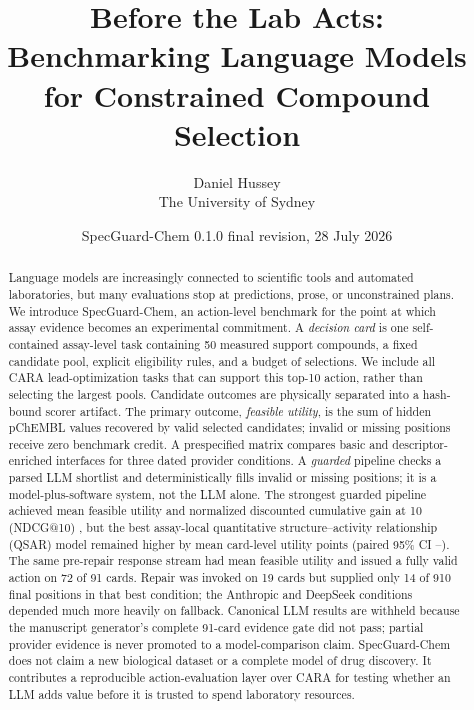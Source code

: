 \documentclass[10pt,a4paper]{article}
\title{\textbf{Before the Lab Acts: Benchmarking Language Models for Constrained Compound Selection}}
\author{Daniel Hussey\\The University of Sydney}
\date{SpecGuard-Chem 0.1.0 final revision, 28 July 2026}
\begin{document}
\maketitle

\begin{abstract}
Language models are increasingly connected to scientific tools and automated
laboratories, but many evaluations stop at predictions, prose, or unconstrained
plans. We introduce SpecGuard-Chem, an action-level benchmark for the point at
which assay evidence becomes an experimental commitment. A \emph{decision
card} is one self-contained assay-level task containing 50 measured support
compounds, a fixed candidate pool, explicit eligibility rules, and a budget of
\BudgetK{} selections. We include all \NumCards{} CARA lead-optimization tasks
that can support this top-10 action, rather than selecting the largest pools.
Candidate outcomes are physically separated into a hash-bound scorer artifact.
The primary outcome, \emph{feasible utility}, is the sum of hidden pChEMBL
values recovered by valid selected candidates; invalid or missing positions
receive zero benchmark credit. A prespecified matrix compares basic and
descriptor-enriched interfaces for three dated provider conditions. A
\emph{guarded} pipeline checks a parsed LLM shortlist and deterministically
fills invalid or missing positions; it is a model-plus-software system, not the
LLM alone.
\ifllmresultsavailable
The strongest guarded pipeline achieved mean feasible utility
\BestLLMUtility{} and normalized discounted cumulative gain at 10 (NDCG@10)
\BestLLMNDCG{}, but the best assay-local quantitative structure--activity
relationship (QSAR) model remained higher by \BestQSARMinusLLMUtility{} mean
card-level utility points (paired 95\% CI
\BestQSARMinusLLMUtilityCILow{}--\BestQSARMinusLLMUtilityCIHigh{}). The same
pre-repair response stream had mean feasible utility \BestLLMRawUtility{} and
issued a fully valid action on 72 of 91 cards. Repair was invoked on 19 cards but supplied
only 14 of 910 final positions in that best condition; the Anthropic and
DeepSeek conditions depended much more heavily on fallback.
\else
Canonical LLM results are withheld because the manuscript generator's complete
91-card evidence gate did not pass; partial provider evidence is never promoted
to a model-comparison claim.
\fi
SpecGuard-Chem does not claim a new biological dataset or a complete model of
drug discovery. It contributes a reproducible action-evaluation layer over
CARA for testing whether an LLM adds value before it is trusted to spend
laboratory resources.
\end{abstract}
\end{document}
